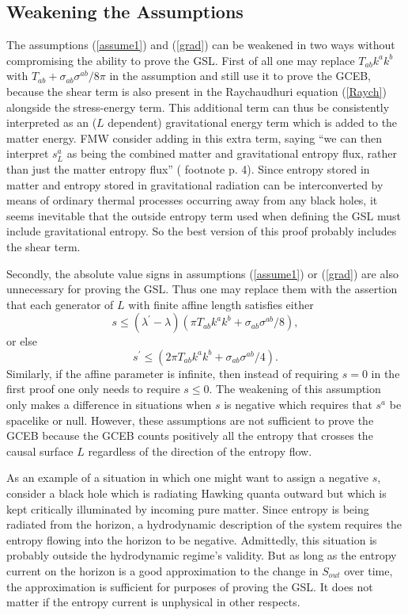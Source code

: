 \documentclass{article}
\begin{document}
\subsection{Weakening the Assumptions}\label{weak}

The assumptions (\ref{assume1}) and (\ref{grad}) can be weakened in two ways without compromising the ability to prove the GSL.  First of all one may replace $T_{ab} k^a k^b$ with $T_{ab} + \sigma_{ab}\sigma^{ab}/8\pi$ in the assumption and still use it to prove the GCEB, because the shear term is also present in the Raychaudhuri equation (\ref{Raych}) alongside the stress-energy term.  This additional term can thus be consistently interpreted as an ($L$ dependent) gravitational energy term which is added to the matter energy.  FMW consider adding in this extra term, saying ``we can then interpret $s^{a}_{L}$ as being the combined matter and gravitational entropy flux, rather than just the matter entropy flux'' (\cite{FMW00} footnote p. 4).  Since entropy stored in matter and entropy stored in gravitational radiation can be interconverted by means of ordinary thermal processes occurring away from any black holes, it seems inevitable that the outside entropy term used when defining the GSL must include gravitational entropy.  So the best version of this proof probably includes the shear term.

Secondly, the absolute value signs in assumptions (\ref{assume1}) or (\ref{grad}) are also unnecessary for proving the GSL.  Thus one may replace them with the assertion that each generator of $L$ with finite affine length satisfies either
\begin{equation}\label{weak1}
s \le (\lambda^{\prime} - \lambda)(\pi T_{ab}k^{a}k^{b} + \sigma_{ab}\sigma^{ab}/8),
\end{equation}
or else
\begin{equation}\label{weak2}
s^{\prime} \le (2\pi T_{ab} k^a k^b + \sigma_{ab}\sigma^{ab}/4).
\end{equation}
Similarly, if the affine parameter is infinite, then instead of requiring $s = 0$ in the first proof one only needs to require $s \le 0$.  The weakening of this assumption only makes a difference in situations when $s$ is negative which requires that $s^a$ be spacelike or null.  However, these assumptions are not sufficient to prove the GCEB because the GCEB counts positively all the entropy that crosses the causal surface $L$ regardless of the direction of the entropy flow.

As an example of a situation in which one might want to assign a negative $s$, consider a black hole which is radiating Hawking quanta outward but which is kept critically illuminated by incoming pure matter.  Since entropy is being radiated from the horizon, a hydrodynamic description of the system requires the entropy flowing into the horizon to be negative.  Admittedly, this situation is probably outside the hydrodynamic regime's validity.  But as long as the entropy current on the horizon is a good approximation to the change in $S_{out}$ over time, the approximation is sufficient for purposes of proving the GSL.  It does not matter if the entropy current is unphysical in other respects.
\end{document}
